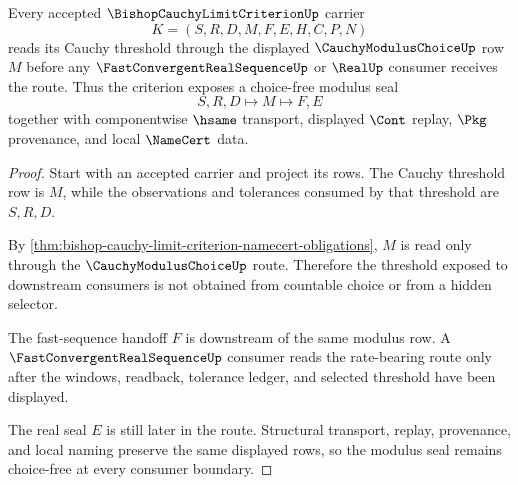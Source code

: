 \begin{theorem}
\label{thm:bishop-cauchy-limit-criterion-modulus-seal}
Every accepted $\BishopCauchyLimitCriterionUp$ carrier
$$
K=(S,R,D,M,F,E,H,C,P,N)
$$
reads its Cauchy threshold through the displayed $\CauchyModulusChoiceUp$ row $M$ before any $\FastConvergentRealSequenceUp$ or $\RealUp$ consumer receives the route. Thus the criterion exposes a choice-free modulus seal
$$
S,R,D \longmapsto M \longmapsto F,E
$$
together with componentwise $\hsame$ transport, displayed $\Cont$ replay, $\Pkg$ provenance, and local $\NameCert$ data.
\end{theorem}
\begin{proof}
Start with an accepted carrier and project its rows. The Cauchy threshold row is $M$, while the observations and tolerances consumed by that threshold are $S,R,D$.

By \autoref{thm:bishop-cauchy-limit-criterion-namecert-obligations}, $M$ is read only through the $\CauchyModulusChoiceUp$ route. Therefore the threshold exposed to downstream consumers is not obtained from countable choice or from a hidden selector.

The fast-sequence handoff $F$ is downstream of the same modulus row. A $\FastConvergentRealSequenceUp$ consumer reads the rate-bearing route only after the windows, readback, tolerance ledger, and selected threshold have been displayed.

The real seal $E$ is still later in the route. Structural transport, replay, provenance, and local naming preserve the same displayed rows, so the modulus seal remains choice-free at every consumer boundary.
\end{proof}

